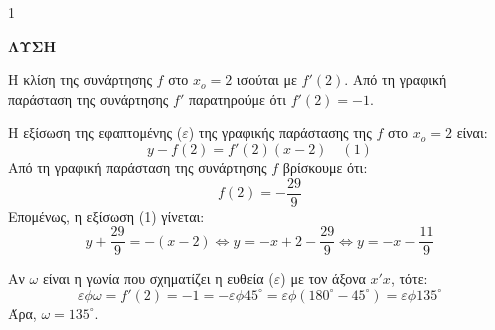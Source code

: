\begin{ylh}{1}
    \item [Ύλη από εικόνα]
\end{ylh}
\textbf{ΛΥΣΗ}

\begin{alist}
    \item Η κλίση της συνάρτησης $f$ στο $x_o = 2$ ισούται με $f'(2)$. Από τη γραφική παράσταση της συνάρτησης $f'$ παρατηρούμε ότι $f'(2) = -1$.
    \item Η εξίσωση της εφαπτομένης ($\varepsilon$) της γραφικής παράστασης της $f$ στο $x_o = 2$ είναι:
    \[ y - f(2) = f'(2)(x - 2) \quad (1) \]
    Από τη γραφική παράσταση της συνάρτησης $f$ βρίσκουμε ότι:
    \[ f(2) = -\frac{29}{9} \]
    Επομένως, η εξίσωση (1) γίνεται:
    \[ y + \frac{29}{9} = -(x - 2) \Leftrightarrow y = -x + 2 - \frac{29}{9} \Leftrightarrow y = -x - \frac{11}{9} \]
    \item Αν $\omega$ είναι η γωνία που σχηματίζει η ευθεία ($\varepsilon$) με τον άξονα $x'x$, τότε:
    \[ \varepsilon\phi\omega = f'(2) = -1 = -\varepsilon\phi45^\circ = \varepsilon\phi(180^\circ - 45^\circ) = \varepsilon\phi135^\circ \]
    Άρα, $\omega = 135^\circ$.
\end{alist}